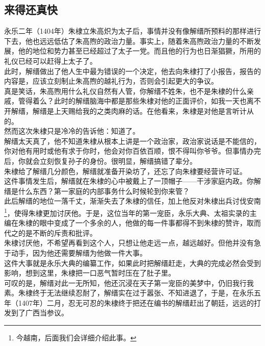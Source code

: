 \begin{multicols}{\theparacolNo}
\subsection{来得还真快}
永乐二年（1404年）朱棣立朱高炽为太子后，事情并没有像解缙所预料的那样进行下去，他也远远低估了朱高煦的政治力量。事实上，随着朱高煦政治力量的不断发展，他的地位和势力甚至已经超过了太子一党。而且他的行为也日渐猖獗，所用的礼仪已经可以赶得上太子了。\\

此时，解缙做出了他人生中最为错误的一个决定，他去向朱棣打了小报告，报告的内容是，应该立刻制止朱高煦的越礼行为，否则会引起更大的争议。\\

真是笑话，朱高煦用什么礼仪自然有人管，你解缙不姓朱，也不是朱棣的什么亲戚，管得着么？此时的解缙脑海中都是那些朱棣对他的正面评价，如我一天也离不开解缙，解缙是上天赐给我的之类肉麻的话。在他看来，朱棣是对他是言听计从的。\\

然而这次朱棣只是冷冷的告诉他：知道了。\\

解缙太天真了，他不知道朱棣从根本上讲是一个政治家，政治家说话是不能信的，你对他有用时或他有求于你时，他会对你百依百顺，恨不得叫你爷爷。但事情办完后，你就会立刻恢复孙子的身份。很明显，解缙搞错了辈分。\\

朱棣给了解缙几分颜色，解缙就准备开染坊了，还忘了向朱棣要经营许可证。\\

这件事情发生后，解缙就在朱棣的心中被戴上了一顶帽子——干涉家庭内政。你解缙是什么东西？第一家庭的内部事务什么时候轮到你来管？\\

此后解缙的地位一落千丈，渐渐失去了朱棣的信任，加上他反对朱棣出兵讨伐安南\footnote{今越南，后面我们会详细介绍此事。}，使得朱棣更加讨厌他。于是，这位当年的第一宠臣，永乐大典、太祖实录的主编在朱棣的眼中变成了一个多余的人，他做的每一件事都得不到朱棣的赞许，取而代之的是不断的斥责和批评。\\

朱棣讨厌他，不希望再看到这个人，只想让他走远一点，越远越好。但他并没有急于动手，因为他还需要解缙为他做一件大事。\\

这件大事就是永乐大典的编纂工作，如果此时把解缙赶走，大典的完成必然会受到影响，想到这里，朱棣把一口恶气暂时压在了肚子里。\\

可叹的是，解缙对此一无所知，他还沉浸在天子第一宠臣的美梦中，仍旧我行我素。朱棣终于无法继续忍耐了，解缙实在过于嚣张、不知进退了，于是，在永乐五年（1407年）二月，忍无可忍的朱棣终于把还在编书的解缙赶出了朝廷，远远的打发到了广西当参议。\\


\end{multicols}
